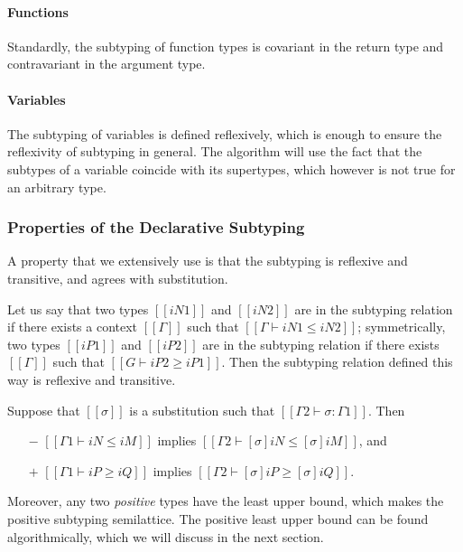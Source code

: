 \paragraph{Functions}
Standardly, the subtyping of function types is covariant in the return type
and contravariant in the argument type.

\paragraph{Variables}
The subtyping of variables is defined reflexively,
which is enough to ensure the reflexivity of subtyping in general.
The algorithm will use the fact that the subtypes of a variable 
coincide with its supertypes, which however is not true for an
arbitrary type.

\subsubsection{Properties of the Declarative Subtyping}
A property that we extensively use is that the subtyping is reflexive and transitive,
and agrees with substitution.

\begin{property}
  Let us say that two types $[[iN1]]$ and $[[iN2]]$ are in the subtyping relation if there 
  exists a context $[[Γ]]$ such that $[[Γ ⊢ iN1 ≤ iN2]]$;
  symmetrically, two types $[[iP1]]$ and $[[iP2]]$ are in the subtyping relation
  if there exists $[[Γ]]$ such that $[[G ⊢ iP2 ≥ iP1]]$.
  Then the subtyping relation defined this way is reflexive and transitive.
\end{property}

\begin{property}
  Suppose that  $[[σ]]$ is a substitution such that $[[Γ2 ⊢ σ : Γ1]]$. 
  Then
  \begin{enumerate}
    \item [$-$] $[[Γ1 ⊢ iN ≤ iM]]$ implies $[[Γ2 ⊢ [σ]iN ≤ [σ]iM]]$, and
    \item [$+$] $[[Γ1 ⊢ iP ≥ iQ]]$ implies $[[Γ2 ⊢ [σ]iP ≥ [σ]iQ]]$.
  \end{enumerate}
\end{property}

Moreover, any two \emph{positive} types have the least upper bound, which makes
the positive subtyping semilattice.
The positive least upper bound can be found algorithmically,
which we will discuss in the next section.

